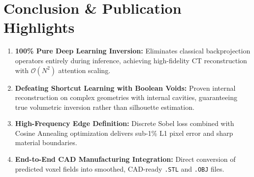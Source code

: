\documentclass[10pt,a4paper]{article}
\begin{document}
\vspace{6pt}
\section{Conclusion \& Publication Highlights}

\begin{tcolorbox}[colback=white, colframe=forestgreen, title=\textbf{Key Scientific \& Engineering Contributions}]
\begin{enumerate}[leftmargin=*,noitemsep]
    \item \textbf{100\% Pure Deep Learning Inversion:} Eliminates classical backprojection operators entirely during inference, achieving high-fidelity CT reconstruction with $\mathcal{O}(N^2)$ attention scaling.
    \item \textbf{Defeating Shortcut Learning with Boolean Voids:} Proven internal reconstruction on complex geometries with internal cavities, guaranteeing true volumetric inversion rather than silhouette estimation.
    \item \textbf{High-Frequency Edge Definition:} Discrete Sobel loss combined with Cosine Annealing optimization delivers sub-1\% L1 pixel error and sharp material boundaries.
    \item \textbf{End-to-End CAD Manufacturing Integration:} Direct conversion of predicted voxel fields into smoothed, CAD-ready \texttt{.STL} and \texttt{.OBJ} files.
\end{enumerate}
\end{tcolorbox}
\end{document}
